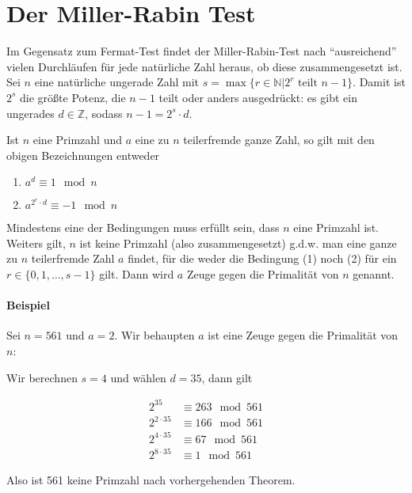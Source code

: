 \section{Der Miller-Rabin Test}

Im Gegensatz zum Fermat-Test findet der Miller-Rabin-Test nach ``ausreichend'' vielen
Durchläufen für jede natürliche Zahl heraus, ob diese zusammengesetzt ist. \\


\noindent Sei $n$ eine natürliche ungerade Zahl mit $s = \max\{r \in \mathbb{N} | 2^r \text{ teilt } n-1\}$.
Damit ist $2^s$ die größte Potenz, die $n-1$ teilt oder anders ausgedrückt: es gibt ein ungerades $d \in \mathbb{Z}$, sodass $n - 1 = 2^s \cdot d$.

\begin{theorem}
    Ist $n$ eine Primzahl und $a$ eine zu $n$ teilerfremde ganze Zahl, so gilt mit den
obigen Bezeichnungen entweder
    \begin{enumerate}
        \item $a^d \equiv 1 \mod n$
        \item$a^{2^r \cdot d} \equiv -1 \mod n$
    \end{enumerate}
\end{theorem}

Mindestens eine der Bedingungen muss erfüllt sein, dass $n$ eine Primzahl ist. Weiters gilt, $n$ ist keine Primzahl (also zusammengesetzt) g.d.w. man eine ganze zu $n$ 
teilerfremde Zahl $a$ findet, für die weder die Bedingung (1) noch (2) für ein $r \in \{0, 1, \ldots, s-1\}$ gilt.
Dann wird $a$ Zeuge gegen die Primalität von $n$ genannt.

\paragraph{Beispiel}
Sei $n = 561$ und $a = 2$. Wir behaupten $a$ ist eine Zeuge gegen die Primalität von $n$:

Wir berechnen $s = 4$ und wählen $d = 35$, dann gilt

\begin{align*}
    2^{35} &\equiv 263 \mod 561 \\
    2^{2\cdot 35} &\equiv 166 \mod 561 \\ 
    2^{4\cdot 35} &\equiv 67 \mod 561 \\
    2^{8\cdot 35} &\equiv 1 \mod 561
\end{align*}

Also ist 561 keine Primzahl nach vorhergehenden Theorem.

